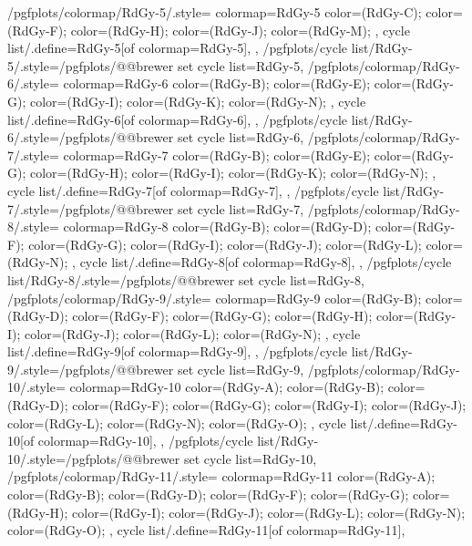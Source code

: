 {  %
  /pgfplots/colormap/RdGy-5/.style={
    colormap={RdGy-5}{
      color=(RdGy-C);
      color=(RdGy-F);
      color=(RdGy-H);
      color=(RdGy-J);
      color=(RdGy-M);
    },
    cycle list/.define={RdGy-5}{[of colormap=RdGy-5]},
  },
  /pgfplots/cycle list/RdGy-5/.style={/pgfplots/@@brewer set cycle list={RdGy-5}},
  /pgfplots/colormap/RdGy-6/.style={
    colormap={RdGy-6}{
      color=(RdGy-B);
      color=(RdGy-E);
      color=(RdGy-G);
      color=(RdGy-I);
      color=(RdGy-K);
      color=(RdGy-N);
    },
    cycle list/.define={RdGy-6}{[of colormap=RdGy-6]},
  },
  /pgfplots/cycle list/RdGy-6/.style={/pgfplots/@@brewer set cycle list={RdGy-6}},
  /pgfplots/colormap/RdGy-7/.style={
    colormap={RdGy-7}{
      color=(RdGy-B);
      color=(RdGy-E);
      color=(RdGy-G);
      color=(RdGy-H);
      color=(RdGy-I);
      color=(RdGy-K);
      color=(RdGy-N);
    },
    cycle list/.define={RdGy-7}{[of colormap=RdGy-7]},
  },
  /pgfplots/cycle list/RdGy-7/.style={/pgfplots/@@brewer set cycle list={RdGy-7}},
  /pgfplots/colormap/RdGy-8/.style={
    colormap={RdGy-8}{
      color=(RdGy-B);
      color=(RdGy-D);
      color=(RdGy-F);
      color=(RdGy-G);
      color=(RdGy-I);
      color=(RdGy-J);
      color=(RdGy-L);
      color=(RdGy-N);
    },
    cycle list/.define={RdGy-8}{[of colormap=RdGy-8]},
  },
  /pgfplots/cycle list/RdGy-8/.style={/pgfplots/@@brewer set cycle list={RdGy-8}},
  /pgfplots/colormap/RdGy-9/.style={
    colormap={RdGy-9}{
      color=(RdGy-B);
      color=(RdGy-D);
      color=(RdGy-F);
      color=(RdGy-G);
      color=(RdGy-H);
      color=(RdGy-I);
      color=(RdGy-J);
      color=(RdGy-L);
      color=(RdGy-N);
    },
    cycle list/.define={RdGy-9}{[of colormap=RdGy-9]},
  },
  /pgfplots/cycle list/RdGy-9/.style={/pgfplots/@@brewer set cycle list={RdGy-9}},
  /pgfplots/colormap/RdGy-10/.style={
    colormap={RdGy-10}{
      color=(RdGy-A);
      color=(RdGy-B);
      color=(RdGy-D);
      color=(RdGy-F);
      color=(RdGy-G);
      color=(RdGy-I);
      color=(RdGy-J);
      color=(RdGy-L);
      color=(RdGy-N);
      color=(RdGy-O);
    },
    cycle list/.define={RdGy-10}{[of colormap=RdGy-10]},
  },
  /pgfplots/cycle list/RdGy-10/.style={/pgfplots/@@brewer set cycle list={RdGy-10}},
  /pgfplots/colormap/RdGy-11/.style={
    colormap={RdGy-11}{
      color=(RdGy-A);
      color=(RdGy-B);
      color=(RdGy-D);
      color=(RdGy-F);
      color=(RdGy-G);
      color=(RdGy-H);
      color=(RdGy-I);
      color=(RdGy-J);
      color=(RdGy-L);
      color=(RdGy-N);
      color=(RdGy-O);
    },
    cycle list/.define={RdGy-11}{[of colormap=RdGy-11]},
}}
